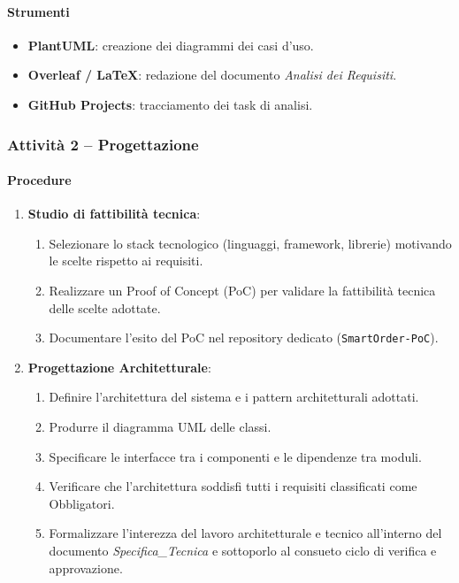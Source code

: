 \documentclass[a4paper, 11pt, oneside]{scrartcl}
\begin{document}
\paragraph{Strumenti}
\begin{itemize}
    \item \textbf{PlantUML}: creazione dei diagrammi dei casi d'uso.
    \item \textbf{Overleaf / \LaTeX{}}: redazione del documento \emph{Analisi dei Requisiti}.
    \item \textbf{GitHub Projects}: tracciamento dei task di analisi.
\end{itemize}

\subsubsection{Attività 2 – Progettazione}

\paragraph{Procedure}
\begin{enumerate}
    \item \textbf{Studio di fattibilità tecnica}:
          \begin{enumerate}[label=\alph*.]
              \item Selezionare lo stack tecnologico (linguaggi, framework{\scriptsize{}}, librerie) motivando le scelte rispetto ai requisiti.
              \item Realizzare un Proof of Concept{\scriptsize{}} (PoC) per validare la fattibilità tecnica delle scelte adottate.
              \item Documentare l'esito del PoC nel repository dedicato (\texttt{SmartOrder-PoC}).
          \end{enumerate}
    \item \textbf{Progettazione Architetturale}:
          \begin{enumerate}[label=\alph*.]
              \item Definire l'architettura{\scriptsize{}} del sistema e i pattern architetturali{\scriptsize{}} adottati.
              \item Produrre il diagramma UML delle classi.
              \item Specificare le interfacce tra i componenti e le dipendenze tra moduli.
              \item Verificare che l'architettura soddisfi tutti i requisiti classificati come Obbligatori.
              \item Formalizzare l'interezza del lavoro architetturale e tecnico all'interno del documento \emph{Specifica\_Tecnica} e sottoporlo al consueto ciclo di verifica e approvazione.
          \end{enumerate}
\end{enumerate}
\end{document}
